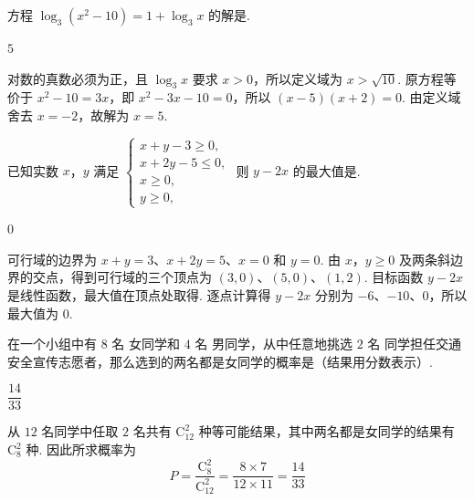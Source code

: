\begin{problem}
方程 \(\log_{3}(x^{2}-10)=1+\log_{3}x\) 的解是\fillinblank{}.
\end{problem}

\begin{answer}
\(5\)
\end{answer}

\begin{solution}
对数的真数必须为正，且 \(\log_3x\) 要求 \(x>0\)，所以定义域为 \(x>\sqrt{10}\). 原方程等价于 \(x^2-10=3x\)，即 \(x^2-3x-10=0\)，所以 \((x-5)(x+2)=0\). 由定义域舍去 \(x=-2\)，故解为 \(x=5\).
\end{solution}

\begin{problem}
已知实数 \(x\)，\(y\) 满足 \(\begin{cases}
x + y - 3 \geqslant 0,\\
x + 2y - 5 \leqslant 0,\\
x \geqslant 0,\\
y \geqslant 0,
\end{cases}\)
则 \(y - 2x\) 的最大值是\fillinblank{}.
\end{problem}

\begin{answer}
\(0\)
\end{answer}

\begin{solution}
可行域的边界为 \(x+y=3\)、\(x+2y=5\)、\(x=0\) 和 \(y=0\). 由 \(x\)，\(y\geqslant0\) 及两条斜边界的交点，得到可行域的三个顶点为 \((3,0)\)、\((5,0)\)、\((1,2)\). 目标函数 \(y-2x\) 是线性函数，最大值在顶点处取得. 逐点计算得 \(y-2x\) 分别为 \(-6\)、\(-10\)、\(0\)，所以最大值为 \(0\).
\end{solution}

\begin{problem}
在一个小组中有 \(8\text{ 名}\) 女同学和 \(4\text{ 名}\) 男同学，从中任意地挑选 \(2\text{ 名}\) 同学担任交通安全宣传志愿者，那么选到的两名都是女同学的概率是\fillinblank{}（结果用分数表示）.
\end{problem}

\begin{answer}
\(\dfrac{14}{33}\)
\end{answer}

\begin{solution}
从 \(12\) 名同学中任取 \(2\) 名共有 \(\mathrm C_{12}^{2}\) 种等可能结果，其中两名都是女同学的结果有 \(\mathrm C_{8}^{2}\) 种. 因此所求概率为
\[
P=\frac{\mathrm C_{8}^{2}}{\mathrm C_{12}^{2}}=\frac{8\times7}{12\times11}=\frac{14}{33}
\]
\end{solution}

